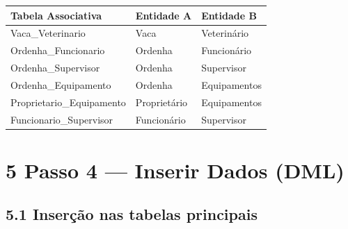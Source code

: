 \documentclass[12pt]{article}
\begin{document}
\vspace{0.2cm}
\begin{center}
\small
\begin{tabular}{|l|l|l|}
\hline
\textbf{Tabela Associativa}  & \textbf{Entidade A}  & \textbf{Entidade B} \\
\hline
Vaca\_Veterinario             & Vaca                 & Veterinário \\
Ordenha\_Funcionario          & Ordenha              & Funcionário \\
Ordenha\_Supervisor           & Ordenha              & Supervisor  \\
Ordenha\_Equipamento          & Ordenha              & Equipamentos \\
Proprietario\_Equipamento     & Proprietário         & Equipamentos \\
Funcionario\_Supervisor       & Funcionário          & Supervisor  \\
\hline
\end{tabular}
\end{center}

\vspace{0.5cm}

\section*{5 \enspace Passo 4 — Inserir Dados (DML)}

\subsection*{5.1 \enspace Inserção nas tabelas principais}
\end{document}
